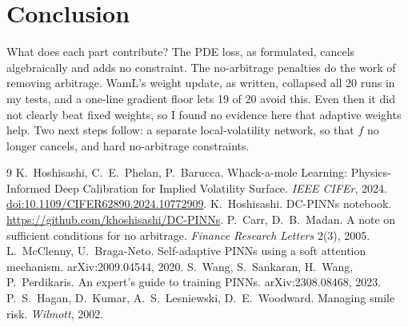 \documentclass[10pt]{article}
\begin{document}
\section{Conclusion}
What does each part contribute? The PDE loss, as formulated, cancels algebraically and adds no constraint. The no-arbitrage penalties do the work of removing arbitrage. WamL's weight update, as written, collapsed all 20 runs in my tests, and a one-line gradient floor lets 19 of 20 avoid this. Even then it did not clearly beat fixed weights, so I found no evidence here that adaptive weights help. Two next steps follow: a separate local-volatility network, so that $f$ no longer cancels, and hard no-arbitrage constraints.

{\footnotesize
\begin{thebibliography}{9}\setlength{\itemsep}{0pt}\setlength{\parskip}{0pt}
 K.~Hoshisashi, C.~E.~Phelan, P.~Barucca. Whack-a-mole Learning: Physics-Informed Deep Calibration for Implied Volatility Surface. \emph{IEEE CIFEr}, 2024. \href{https://doi.org/10.1109/CIFER62890.2024.10772909}{doi:10.1109/CIFER62890.2024.10772909}.
 K.~Hoshisashi. DC-PINNs notebook. \url{https://github.com/khoshisashi/DC-PINNs}.
 P.~Carr, D.~B.~Madan. A note on sufficient conditions for no arbitrage. \emph{Finance Research Letters} 2(3), 2005.
 L.~McClenny, U.~Braga-Neto. Self-adaptive PINNs using a soft attention mechanism. arXiv:2009.04544, 2020.
 S.~Wang, S.~Sankaran, H.~Wang, P.~Perdikaris. An expert's guide to training PINNs. arXiv:2308.08468, 2023.
 P.~S.~Hagan, D.~Kumar, A.~S.~Lesniewski, D.~E.~Woodward. Managing smile risk. \emph{Wilmott}, 2002.
\end{thebibliography}
}
\end{document}
